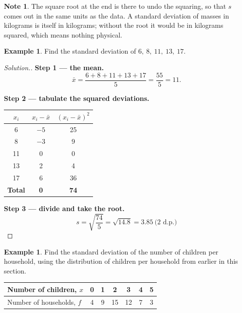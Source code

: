 \documentclass[11pt,a4paper]{article}
\theoremstyle{definition}
\newtheorem{example}[thm]{Example}
\newtheorem{note}[thm]{Note}
\newenvironment{solution}
  {\renewcommand{\qedsymbol}{}\begin{proof}[\textit{Solution}.]}
  {\end{proof}}
\begin{document}
\begin{note}
The square root at the end is there to undo the squaring, so that $s$ comes out in the
same units as the data. A standard deviation of masses in kilograms is itself in
kilograms; without the root it would be in kilograms squared, which means nothing
physical.
\end{note}

\begin{example}
Find the standard deviation of $6,\ 8,\ 11,\ 13,\ 17$.
\end{example}

\begin{solution}
\textbf{Step 1 --- the mean.}
$$\bar{x}=\frac{6+8+11+13+17}{5}=\frac{55}{5}=11.$$

\textbf{Step 2 --- tabulate the squared deviations.}

\begin{table}[H]
\centering
\begin{tabular}{|c|c|c|}
\hline
$x_i$ & $x_i-\bar{x}$ & $\left(x_i-\bar{x}\right)^2$\\
\hline
6 & $-5$ & 25\\
8 & $-3$ & 9\\
11 & 0 & 0\\
13 & 2 & 4\\
17 & 6 & 36\\
\hline
\textbf{Total} & \textbf{0} & \textbf{74}\\
\hline
\end{tabular}
\end{table}

\textbf{Step 3 --- divide and take the root.}
$$s=\sqrt{\frac{74}{5}}=\sqrt{14.8}=3.85\ \text{(2 d.p.)}$$
\end{solution}

\begin{example}
Find the standard deviation of the number of children per household, using the
distribution of children per household from earlier in this section.

\begin{table}[H]
\centering
\begin{tabular}{|l|c|c|c|c|c|c|}
\hline
Number of children, $x$ & 0 & 1 & 2 & 3 & 4 & 5\\
\hline
Number of households, $f$ & 4 & 9 & 15 & 12 & 7 & 3\\
\hline
\end{tabular}
\end{table}
\end{example}
\end{document}
